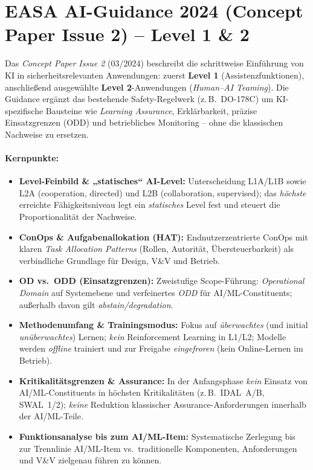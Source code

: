 \section{EASA AI-Guidance 2024 (Concept Paper Issue 2) – Level 1 \& 2 \parencite{easa-ai-concept-issue2-2024}}
Das \emph{Concept Paper Issue 2} (03/2024) beschreibt die schrittweise Einführung von KI in sicherheitsrelevanten Anwendungen: 
zuerst \textbf{Level 1} (Assistenzfunktionen), anschließend ausgewählte \textbf{Level 2}-Anwendungen (\emph{Human–AI Teaming}). 
Die Guidance ergänzt das bestehende Safety-Regelwerk (z.\,B.\ DO-178C) um KI-spezifische Bausteine wie \emph{Learning Assurance}, 
Erklärbarkeit, präzise Einsatzgrenzen (ODD) und betriebliches Monitoring – ohne die klassischen Nachweise zu ersetzen.

\paragraph{Kernpunkte:}
\begin{itemize}
  \item \textbf{Level-Feinbild \& „statisches“ AI-Level:} Unterscheidung L1A/L1B sowie L2A (cooperation, directed) und L2B (collaboration, supervised); das \emph{höchste} erreichte Fähigkeitsniveau legt ein \emph{statisches} Level fest und steuert die Proportionalität der Nachweise.
  \item \textbf{ConOps \& Aufgabenallokation (HAT):} Endnutzerzentrierte ConOps mit klaren \emph{Task Allocation Patterns} (Rollen, Autorität, Übersteuerbarkeit) als verbindliche Grundlage für Design, V\&V und Betrieb.
  \item \textbf{OD vs.\ ODD (Einsatzgrenzen):} Zweistufige Scope-Führung: \emph{Operational Domain} auf Systemebene und verfeinertes \emph{ODD} für AI/ML-Constituents; außerhalb davon gilt \emph{abstain/degradation}.
  \item \textbf{Methodenumfang \& Trainingsmodus:} Fokus auf \emph{überwachtes} (und initial \emph{unüberwachtes}) Lernen; \emph{kein} Reinforcement Learning in L1/L2; Modelle werden \emph{offline} trainiert und zur Freigabe \emph{eingefroren} (kein Online-Lernen im Betrieb).
  \item \textbf{Kritikalitätsgrenzen \& Assurance:} In der Anfangsphase \emph{kein} Einsatz von AI/ML-Constituents in höchsten Kritikalitäten (z.\,B.\ IDAL~A/B, SWAL~1/2); \emph{keine} Reduktion klassischer Assurance-Anforderungen innerhalb der AI/ML-Teile.
  \item \textbf{Funktionsanalyse bis zum AI/ML-Item:} Systematische Zerlegung bis zur Trennlinie AI/ML-Item vs.\ traditionelle Komponenten, Anforderungen und V\&V zielgenau führen zu können.
\end{itemize}




